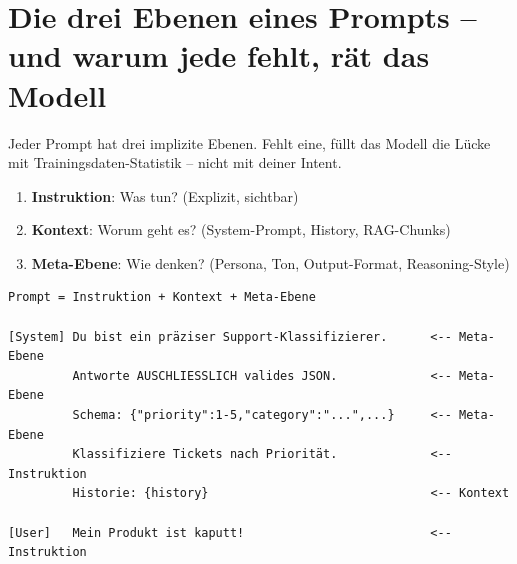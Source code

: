 
\section{Die drei Ebenen eines Prompts -- und warum jede fehlt, rät das Modell}

Jeder Prompt hat drei implizite Ebenen. Fehlt eine, füllt das Modell die Lücke mit Trainingsdaten-Statistik -- nicht mit deiner Intent.

\begin{enumerate}
    \item \textbf{Instruktion}: Was tun? (Explizit, sichtbar)
    \item \textbf{Kontext}: Worum geht es? (System-Prompt, History, RAG-Chunks)
    \item \textbf{Meta-Ebene}: Wie denken? (Persona, Ton, Output-Format, Reasoning-Style)
\end{enumerate}


\begin{verbatim}
Prompt = Instruktion + Kontext + Meta-Ebene

[System] Du bist ein präziser Support-Klassifizierer.      <-- Meta-Ebene
         Antworte AUSCHLIESSLICH valides JSON.             <-- Meta-Ebene
         Schema: {"priority":1-5,"category":"...",...}     <-- Meta-Ebene
         Klassifiziere Tickets nach Priorität.             <-- Instruktion
         Historie: {history}                               <-- Kontext

[User]   Mein Produkt ist kaputt!                          <-- Instruktion
\end{verbatim}

